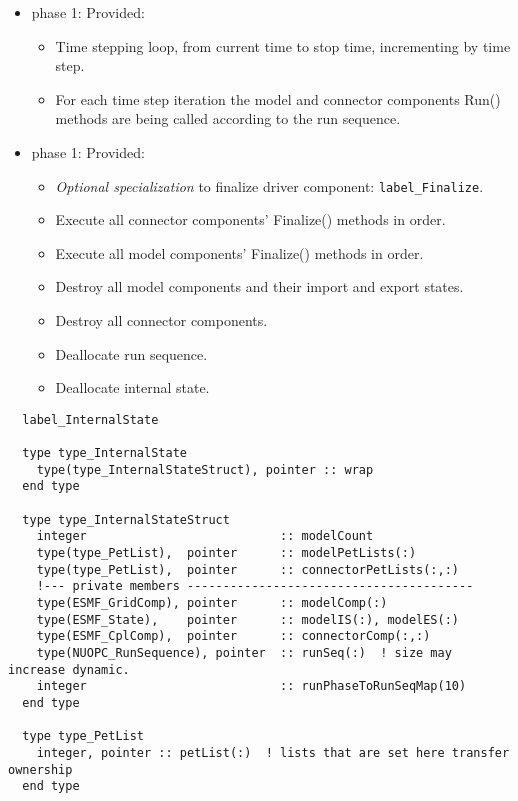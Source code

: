 \begin{itemize}
\item phase 1: {\sc Provided:}
  \begin{itemize}
  \item Time stepping loop, from current time to stop time, incrementing by time step.
  \item For each time step iteration the model and connector components Run() methods are being called according to the run sequence.
  \end{itemize}    
\end{itemize}

\begin{itemize}
\item phase 1: {\sc Provided:}
  \begin{itemize}
  \item {\it Optional specialization} to finalize driver component: {\tt label\_Finalize}.
  \item Execute all connector components' Finalize() methods in order.
  \item Execute all model components' Finalize() methods in order.
  \item Destroy all model components and their import and export states.
  \item Destroy all connector components.
  \item Deallocate run sequence.
  \item Deallocate internal state.
  \end{itemize}      
\end{itemize}

\begin{verbatim}  label_InternalState

  type type_InternalState
    type(type_InternalStateStruct), pointer :: wrap
  end type

  type type_InternalStateStruct
    integer                           :: modelCount
    type(type_PetList),  pointer      :: modelPetLists(:)
    type(type_PetList),  pointer      :: connectorPetLists(:,:)
    !--- private members ----------------------------------------
    type(ESMF_GridComp), pointer      :: modelComp(:)
    type(ESMF_State),    pointer      :: modelIS(:), modelES(:)
    type(ESMF_CplComp),  pointer      :: connectorComp(:,:)
    type(NUOPC_RunSequence), pointer  :: runSeq(:)  ! size may increase dynamic.
    integer                           :: runPhaseToRunSeqMap(10)
  end type

  type type_PetList
    integer, pointer :: petList(:)  ! lists that are set here transfer ownership
  end type
  
\end{verbatim}

